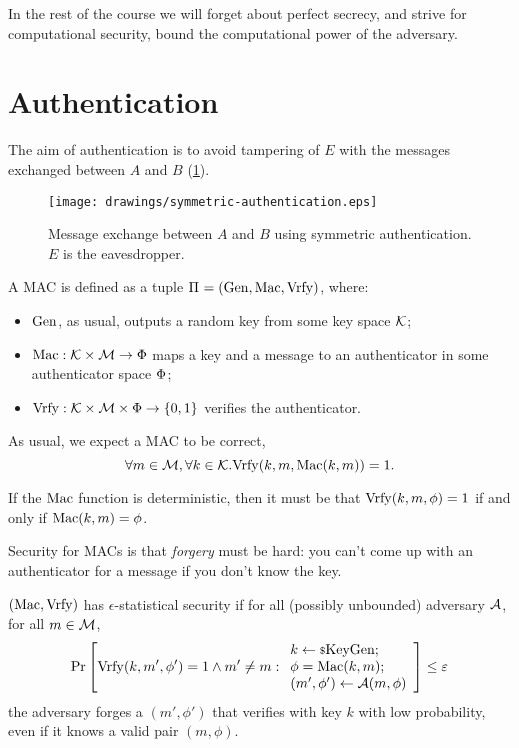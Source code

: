 In the rest of the course we will forget about perfect secrecy, and strive for computational security, \ie bound the computational power of the adversary.

\section{Authentication}

The aim of authentication is to avoid tampering of $E$ with the messages exchanged between $A$ and $B$ (\cref{fig:symmetric-authentication}).

\begin{figure}
	\centering
	\texttt{[image: drawings/symmetric-authentication.eps]}
	\caption{Message exchange between $A$ and $B$ using symmetric authentication. $E$ is the eavesdropper.}
	\label{fig:symmetric-authentication}
\end{figure}

A \ac{MAC} is defined as a tuple $\Pi_{} = \left( \mathrm{Gen}, \allowbreak \mathrm{Mac}, \allowbreak \mathrm{Vrfy} \right)$, where:
\begin{itemize}
	\item $\mathrm{Gen}$, as usual, outputs a random key from some key space $\mathcal{K}$;
	\item $\mathrm{Mac} : \mathcal{K} \times \mathcal{M} \to \Phi$ maps a key and a message to an authenticator in some authenticator space $\Phi$;
	\item $\mathrm{Vrfy} : \mathcal{K} \times \mathcal{M} \times \Phi \to \{0,1\}$ verifies the authenticator.
\end{itemize}
As usual, we expect a \ac{MAC} to be correct, \ie
\begin{equation*}
	\forall m \in \mathcal{M}, \forall k \in \mathcal{K} . \mathrm{Vrfy}(k, m, \mathrm{Mac}(k, m)) = 1.
\end{equation*}

If the $\mathrm{Mac}$ function is deterministic, then it must be that $\mathrm{Vrfy}(k, m, \phi) = 1$ if and only if $\mathrm{Mac}(k, m) = \phi$.

Security for \acp{MAC} is that \emph{forgery} must be hard: you can't come up with an authenticator for a message if you don't know the key.

\begin{definition}
	$(\mathrm{Mac}, \mathrm{Vrfy})$ has $\epsilon$-statistical security if for all (possibly unbounded) adversary $\mathcal{A}$, for all $m \in \mathcal{M}$,
	\begin{equation*}
		\mathop{\mathrm{Pr}}\limits_{} \left[ {
			\mathrm{Vrfy}(k, m', \phi') = 1 \land m' \neq m :
			\begin{array}{l}
				k \leftarrow {\scriptstyle \$} {\mathrm{KeyGen}}; \; \\
				\phi = \mathrm{Mac}(k,m); \; \\
				(m', \phi') \leftarrow \mathcal{A}(m,\phi)
			\end{array}
		} \right] \le \varepsilon
	\end{equation*}
	\ie the adversary forges a $(m',\phi')$ that verifies with key $k$ with low probability, even if it knows a valid pair $(m, \phi)$.
\end{definition}

